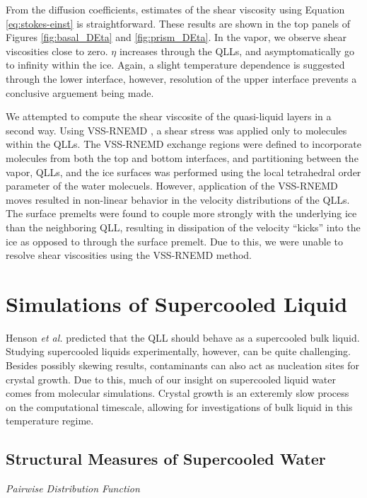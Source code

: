 From the diffusion coefficients, estimates of the shear viscosity
using Equation \eqref{eq:stokes-einst} is straightforward. These
results are shown in the top panels of Figures \ref{fig:basal_DEta}
and \ref{fig:prism_DEta}. In the vapor, we observe shear viscosities
close to zero.  $\eta$ increases through the QLLs, and
asymptomatically go to infinity within the ice. Again, a slight
temperature dependence is suggested through the lower interface,
however, resolution of the upper interface prevents a conclusive
arguement being made. 

We attempted to compute the shear viscosite of the quasi-liquid layers
in a second way. Using VSS-RNEMD \cite{Kuang2012}, a shear stress was
applied only to molecules within the QLLs. The VSS-RNEMD exchange
regions were defined to incorporate molecules from both the top and
bottom interfaces, and partitioning between the vapor, QLLs, and the
ice surfaces was performed using the local tetrahedral order parameter
of the water molecuels. However, application of the VSS-RNEMD moves
resulted in non-linear behavior in the velocity distributions of the
QLLs. The surface premelts were found to couple more strongly with the
underlying ice than the neighboring QLL, resulting in dissipation of
the velocity ``kicks'' into the ice as opposed to through the surface
premelt. Due to this, we were unable to resolve shear viscosities
using the VSS-RNEMD method. 



\section{Simulations of Supercooled Liquid}
Henson \textit{et al.} predicted that the QLL should behave as a
supercooled bulk liquid.\cite{Henson2005} Studying supercooled liquids
experimentally, however, can be quite challenging. Besides possibly
skewing results, contaminants can also act as nucleation sites for
crystal growth. Due to this, much of our insight on supercooled liquid
water comes from molecular simulations. Crystal growth is an exteremly
slow process on the computational timescale, allowing for
investigations of bulk liquid in this temperature regime. 

\subsection{Structural Measures of Supercooled Water}

\begin{flushleft}
\textit{Pairwise Distribution Function}
\end{flushleft}

